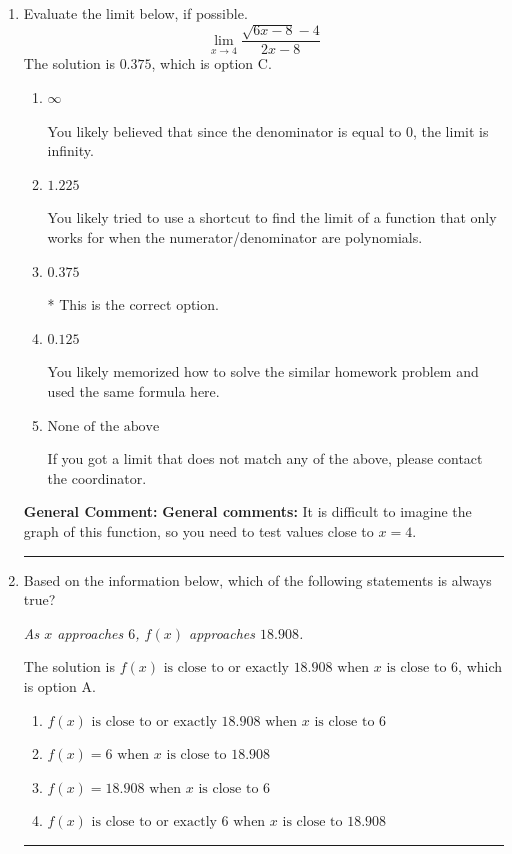 \documentclass{extbook}[14pt]
\newcommand{\litem}[1]{\item #1

\rule{\textwidth}{0.4pt}}
\begin{document}
\begin{enumerate}\litem{
Evaluate the limit below, if possible.
\[ \lim_{x \rightarrow 4} \frac{\sqrt{6x - 8} - 4}{2x - 8} \]The solution is \( 0.375 \), which is option C.\begin{enumerate}[label=\Alph*.]
\item \( \infty \)

You likely believed that since the denominator is equal to 0, the limit is infinity.
\item \( 1.225 \)

You likely tried to use a shortcut to find the limit of a function that only works for when the numerator/denominator are polynomials.
\item \( 0.375 \)

* This is the correct option.
\item \( 0.125 \)

You likely memorized how to solve the similar homework problem and used the same formula here.
\item \( \text{None of the above} \)

If you got a limit that does not match any of the above, please contact the coordinator.
\end{enumerate}

\textbf{General Comment:} \textbf{General comments:} It is difficult to imagine the graph of this function, so you need to test values close to $x = 4$.
}
\litem{
Based on the information below, which of the following statements is always true?

\begin{center}
    \textit{ As $x$ approaches $6$, $f(x)$ approaches $18.908$. }
\end{center}
The solution is \( f(x) \text{ is close to or exactly } 18.908 \text{ when } x \text{ is close to } 6 \), which is option A.\begin{enumerate}[label=\Alph*.]
\item \( f(x) \text{ is close to or exactly } 18.908 \text{ when } x \text{ is close to } 6 \)


\item \( f(x) = 6 \text{ when } x \text{ is close to } 18.908 \)


\item \( f(x) = 18.908 \text{ when } x \text{ is close to } 6 \)


\item \( f(x) \text{ is close to or exactly } 6 \text{ when } x \text{ is close to } 18.908 \)



\end{enumerate}}
\end{enumerate}
\end{document}

